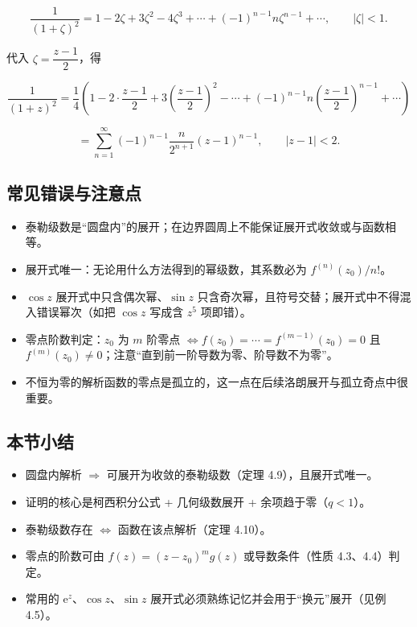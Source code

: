 \[
\frac{1}{(1+\zeta)^2}=1-2\zeta+3\zeta^2-4\zeta^3+\cdots+(-1)^{n-1}n\zeta^{n-1}+\cdots,\qquad|\zeta|<1 .
\]

代入 \(\zeta=\dfrac{z-1}{2}\)，得

\[
\frac{1}{(1+z)^2}=\frac{1}{4}\left(1-2\cdot\frac{z-1}{2}+3\left(\frac{z-1}{2}\right)^2-\cdots+(-1)^{n-1}n\left(\frac{z-1}{2}\right)^{n-1}+\cdots\right)
\]

\[
=\sum_{n=1}^{\infty}(-1)^{n-1}\frac{n}{2^{n+1}}(z-1)^{n-1},\qquad |z-1|<2 .
\]

\subsection{常见错误与注意点}\label{ux5e38ux89c1ux9519ux8befux4e0eux6ce8ux610fux70b9-13}

\begin{itemize}
\tightlist
\item
  泰勒级数是``圆盘内''的展开；在边界圆周上不能保证展开式收敛或与函数相等。
\item
  展开式唯一：无论用什么方法得到的幂级数，其系数必为
  \(f^{(n)}(z_0)/n!\)。
\item
  \(\cos z\) 展开式中只含偶次幂、\(\sin z\)
  只含奇次幂，且符号交替；展开式中不得混入错误幂次（如把 \(\cos z\)
  写成含 \(z^5\) 项即错）。
\item
  零点阶数判定：\(z_0\) 为 \(m\) 阶零点
  \(\iff f(z_0)=\cdots=f^{(m-1)}(z_0)=0\) 且
  \(f^{(m)}(z_0)\neq 0\)；注意``直到前一阶导数为零、阶导数不为零''。
\item
  不恒为零的解析函数的零点是孤立的，这一点在后续洛朗展开与孤立奇点中很重要。
\end{itemize}

\subsection{本节小结}\label{ux672cux8282ux5c0fux7ed3-13}

\begin{itemize}
\tightlist
\item
  圆盘内解析 \(\Rightarrow\) 可展开为收敛的泰勒级数（定理
  4.9），且展开式唯一。
\item
  证明的核心是柯西积分公式 + 几何级数展开 + 余项趋于零（\(q<1\)）。
\item
  泰勒级数存在 \(\iff\) 函数在该点解析（定理 4.10）。
\item
  零点的阶数可由 \(f(z)=(z-z_0)^m g(z)\) 或导数条件（性质
  4.3、4.4）判定。
\item
  常用的 \(\mathrm{e}^z\)、\(\cos z\)、\(\sin z\)
  展开式必须熟练记忆并会用于``换元''展开（见例 4.5）。
\end{itemize}


